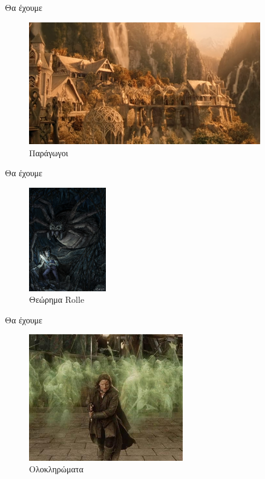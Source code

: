 \documentclass[greek]{beamer}
\begin{document}
\begin{frame}{Θα έχουμε}
      \begin{figure}
            \centering
            \includegraphics[width=0.9\textwidth]{"images/riverdale"}
            \caption{Παράγωγοι}
      \end{figure}
\end{frame}

\begin{frame}{Θα έχουμε}
      \begin{figure}
            \centering
            \includegraphics[width=0.3\textwidth]{"images/shelob"}
            \caption{Θεώρημα Rolle}
      \end{figure}
\end{frame}

\begin{frame}{Θα έχουμε}
      \begin{figure}
            \centering
            \includegraphics[width=0.6\textwidth]{"images/armyofdead"}
            \caption{Ολοκληρώματα}
      \end{figure}
\end{frame}
\end{document}
